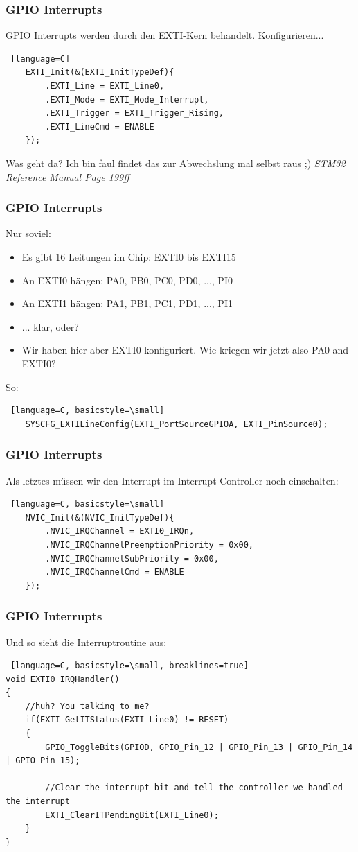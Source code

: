 \documentclass[ngerman,compress]{beamer}
\begin{document}
\begin{frame} [fragile]
	\frametitle{GPIO Interrupts}
	GPIO Interrupts werden durch den EXTI-Kern behandelt. Konfigurieren...
	\begin{lstlisting} [language=C]
	EXTI_Init(&(EXTI_InitTypeDef){
		.EXTI_Line = EXTI_Line0,
		.EXTI_Mode = EXTI_Mode_Interrupt,
		.EXTI_Trigger = EXTI_Trigger_Rising,
		.EXTI_LineCmd = ENABLE
	});
	\end{lstlisting}
	Was geht da? Ich bin faul findet das zur Abwechslung mal selbst raus ;) \emph{STM32 Reference Manual Page 199ff}
\end{frame}

\begin{frame} [fragile]
	\frametitle{GPIO Interrupts}
	Nur soviel: 
	\begin{itemize}
		\item Es gibt 16 Leitungen im Chip: EXTI0 bis EXTI15
		\item An EXTI0 hängen: PA0, PB0, PC0, PD0, ..., PI0
		\item An EXTI1 hängen: PA1, PB1, PC1, PD1, ..., PI1
		\item ... klar, oder?
		\item Wir haben hier aber EXTI0 konfiguriert. Wie kriegen wir jetzt also PA0 and EXTI0?
	\end{itemize}
	\pause
	So:
	\begin{lstlisting} [language=C, basicstyle=\small]
	SYSCFG_EXTILineConfig(EXTI_PortSourceGPIOA, EXTI_PinSource0);
	\end{lstlisting}
\end{frame}

\begin{frame} [fragile]
	\frametitle{GPIO Interrupts}
	Als letztes müssen wir den Interrupt im Interrupt-Controller noch einschalten:
	\begin{lstlisting} [language=C, basicstyle=\small]
    NVIC_Init(&(NVIC_InitTypeDef){
        .NVIC_IRQChannel = EXTI0_IRQn,
        .NVIC_IRQChannelPreemptionPriority = 0x00,
        .NVIC_IRQChannelSubPriority = 0x00,
        .NVIC_IRQChannelCmd = ENABLE
    });
	\end{lstlisting}
\end{frame}

\begin{frame} [fragile]
	\frametitle{GPIO Interrupts}
	Und so sieht die Interruptroutine aus:
	\begin{lstlisting} [language=C, basicstyle=\small, breaklines=true]
void EXTI0_IRQHandler()
{
    //huh? You talking to me?
    if(EXTI_GetITStatus(EXTI_Line0) != RESET)
    {
        GPIO_ToggleBits(GPIOD, GPIO_Pin_12 | GPIO_Pin_13 | GPIO_Pin_14 | GPIO_Pin_15);

        //Clear the interrupt bit and tell the controller we handled the interrupt
        EXTI_ClearITPendingBit(EXTI_Line0);
    }
}
	\end{lstlisting}
\end{frame}
\end{document}

